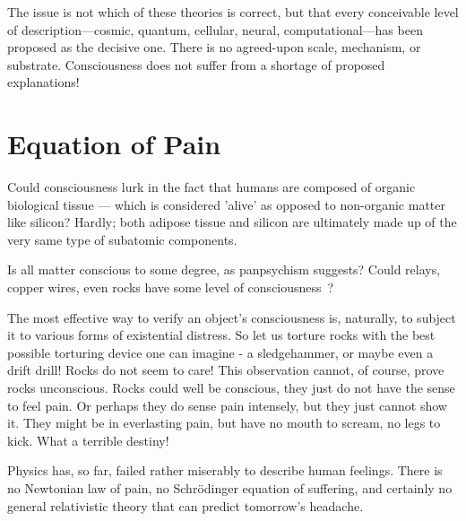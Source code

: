 The issue is not which of these theories is correct, but that every conceivable level of description—cosmic, quantum, cellular, neural, computational—has been proposed as the decisive one. There is no agreed-upon scale, mechanism, or substrate. Consciousness does not suffer from a shortage of proposed explanations!


\section{Equation of Pain}

Could consciousness lurk in the fact that humans are composed of organic biological tissue — which is considered 'alive' as opposed to non-organic matter like silicon? Hardly; both adipose tissue and silicon are ultimately made up of the very same type of subatomic components.

Is all matter conscious to some degree, as panpsychism suggests? Could relays, copper wires, even rocks have some level of 
consciousness~\cite{Goff2019,Strawson2006,Chalmers2015,Whitehead1929}?

The most effective way to verify an object's consciousness is, naturally, to subject it to various forms of existential distress.
So let us torture rocks with the best possible torturing device one can imagine - a sledgehammer, or maybe even a drift drill!
Rocks do not seem to care! This observation cannot, of course, prove rocks unconscious. Rocks could well be conscious, 
they just do not have the sense to feel pain. Or perhaps they do sense pain intensely, but they just cannot show it. 
They might be in everlasting pain, but have no mouth to scream, no legs to kick. What a terrible destiny!

Physics has, so far, failed rather miserably to describe human feelings. There is no Newtonian law of pain, no Schrödinger equation of suffering,
and certainly no general relativistic theory that can predict tomorrow’s headache.

